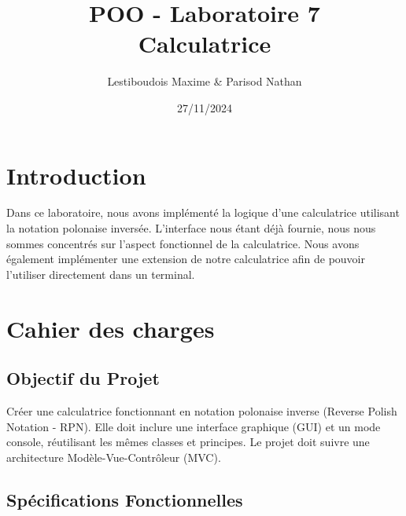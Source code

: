 \documentclass[12pt]{report}
\title{POO - Laboratoire 7 \\ \large Calculatrice}
\author{Lestiboudois Maxime \& Parisod Nathan}
\date{27/11/2024}
\begin{document}
    \maketitle
    \tableofcontents
    \newpage


    \section*{Introduction}
    Dans ce laboratoire, nous avons implémenté la logique d'une calculatrice utilisant la notation polonaise inversée.
    L'interface nous étant déjà fournie, nous nous sommes concentrés sur l'aspect fonctionnel de la calculatrice.
    \newline Nous avons également implémenter une extension de notre calculatrice afin de pouvoir l'utiliser directement
    dans un terminal.

    \section*{Cahier des charges}
        \subsection*{Objectif du Projet}
        Créer une calculatrice fonctionnant en notation polonaise inverse (Reverse Polish Notation - RPN). Elle doit inclure une interface graphique (GUI) et un mode console, réutilisant les mêmes classes et principes. Le projet doit suivre une architecture Modèle-Vue-Contrôleur (MVC).

        \subsection*{Spécifications Fonctionnelles}
\end{document}
